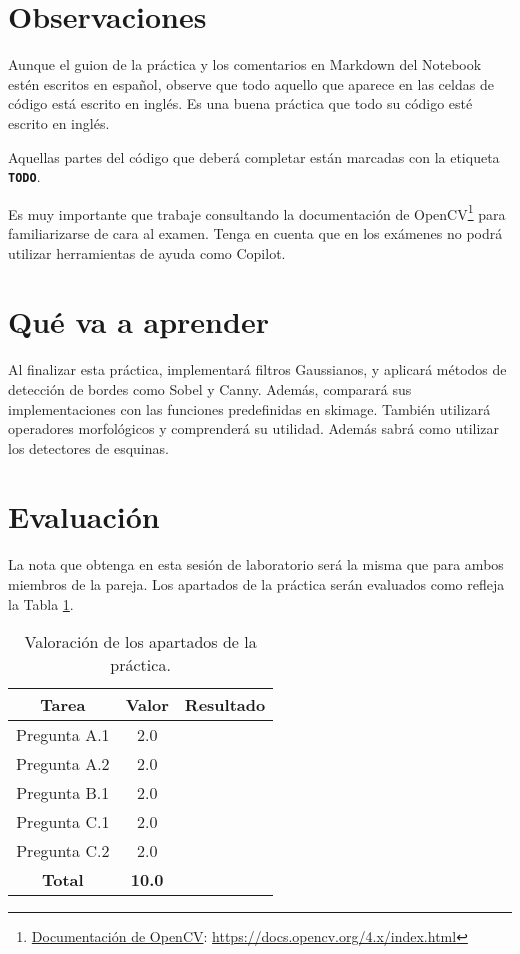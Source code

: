 \section{Observaciones}

Aunque el guion de la práctica y los comentarios en Markdown del Notebook estén escritos en español, observe que todo aquello que aparece en las celdas de código está escrito en inglés. Es una buena práctica que todo su código esté escrito en inglés.

Aquellas partes del código que deberá completar están marcadas con la etiqueta \textbf{\texttt{TODO}}.

Es muy importante que trabaje consultando la documentación de OpenCV\footnote{\href{https://docs.opencv.org/4.x/index.html}{Documentación de OpenCV}: \url{https://docs.opencv.org/4.x/index.html}} para familiarizarse de cara al examen. Tenga en cuenta que en los exámenes no podrá utilizar herramientas de ayuda como Copilot.

\section{Qué va a aprender}

Al finalizar esta práctica, implementará filtros Gaussianos, y aplicará métodos de detección de bordes como Sobel y Canny. Además, comparará sus implementaciones con las funciones predefinidas en skimage. También utilizará operadores morfológicos y comprenderá su utilidad. Además sabrá como utilizar los detectores de esquinas.

\section{Evaluación}

La nota que obtenga en esta sesión de laboratorio será la misma que para ambos miembros de la pareja. Los apartados de la práctica serán evaluados como refleja la Tabla \ref{table:evaluacion}.

\begin{table}[h!]
    \centering
    \begin{tabular}{|c|c|c|}
    \hline
    \textbf{Tarea} & \textbf{Valor} & \textbf{Resultado} \\
    \hline
    Pregunta A.1 & 2.0 & \\
    \hline
    Pregunta A.2 & 2.0 & \\
    \hline
    Pregunta B.1 & 2.0 & \\
    \hline
    Pregunta C.1 & 2.0 & \\
    \hline
    Pregunta C.2 & 2.0& \\
    \hline
    \textbf{Total} & \textbf{10.0} & \\
    \hline
    \end{tabular}
    \caption{Valoración de los apartados de la práctica.}
    \label{table:evaluacion}
\end{table}
